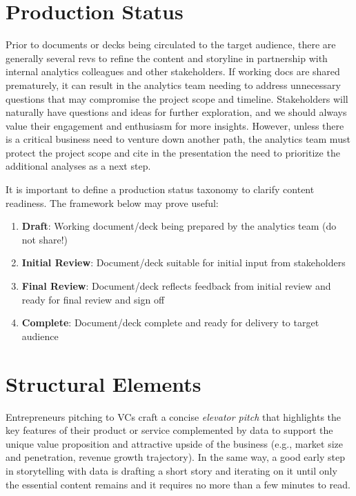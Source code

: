 \documentclass[
]{book}
\providecommand{\tightlist}{%
  \setlength{\itemsep}{0pt}\setlength{\parskip}{0pt}}
\begin{document}
\hypertarget{production-status}{%
\section{Production Status}\label{production-status}}

Prior to documents or decks being circulated to the target audience, there are generally several revs to refine the content and storyline in partnership with internal analytics colleagues and other stakeholders. If working docs are shared prematurely, it can result in the analytics team needing to address unnecessary questions that may compromise the project scope and timeline. Stakeholders will naturally have questions and ideas for further exploration, and we should always value their engagement and enthusiasm for more insights. However, unless there is a critical business need to venture down another path, the analytics team must protect the project scope and cite in the presentation the need to prioritize the additional analyses as a next step.

It is important to define a production status taxonomy to clarify content readiness. The framework below may prove useful:

\begin{enumerate}
\def\labelenumi{\arabic{enumi}.}
\tightlist
\item
  \textbf{Draft}: Working document/deck being prepared by the analytics team (do not share!)
\item
  \textbf{Initial Review}: Document/deck suitable for initial input from stakeholders
\item
  \textbf{Final Review}: Document/deck reflects feedback from initial review and ready for final review and sign off
\item
  \textbf{Complete}: Document/deck complete and ready for delivery to target audience
\end{enumerate}

\hypertarget{structural-elements}{%
\section{Structural Elements}\label{structural-elements}}

Entrepreneurs pitching to VCs craft a concise \emph{elevator pitch} that highlights the key features of their product or service complemented by data to support the unique value proposition and attractive upside of the business (e.g., market size and penetration, revenue growth trajectory). In the same way, a good early step in storytelling with data is drafting a short story and iterating on it until only the essential content remains and it requires no more than a few minutes to read.
\end{document}
